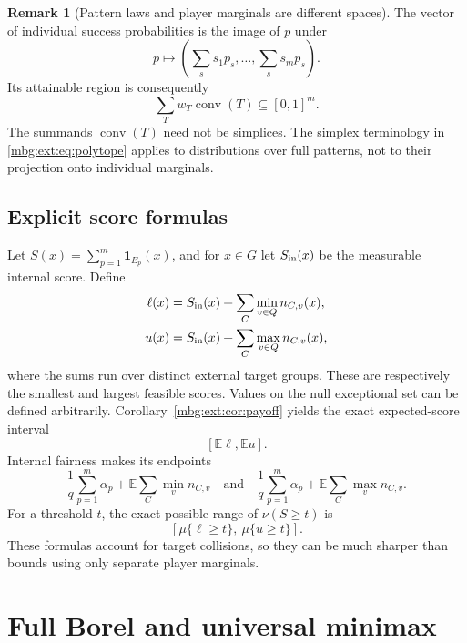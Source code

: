 \documentclass[11pt,letterpaper]{article}
\theoremstyle{definition}
\newtheorem{remark}[theorem]{Remark}
\newcommand{\E}{\mathbb E}
\newcommand{\ind}{\mathbf 1}
\newcommand{\conv}{\operatorname{conv}}
\begin{document}
\begin{remark}[Pattern laws and player marginals are different spaces]
The vector of individual success probabilities is the image of $p$ under
\[
p\longmapsto\left(\sum_s s_1p_s,\ldots,\sum_s s_mp_s\right).
\]
Its attainable region is consequently
\[
\sum_Tw_T\conv(T)\subseteq[0,1]^m.
\]
The summands $\conv(T)$ need not be simplices. The simplex terminology in \eqref{mbg:ext:eq:polytope} applies to distributions over full patterns, not to their projection onto individual marginals.
\end{remark}

\subsection{Explicit score formulas}

Let $S(x)=\sum_{p=1}^m\ind_{E_p}(x)$, and for $x\in G$ let $S_{\rm in}(x)$ be the measurable internal score. Define
\begin{align}
\ell(x)&=S_{\rm in}(x)+\sum_{C}\min_{v\in Q}n_{C,v}(x),\label{mbg:ext:eq:low-score}\\
u(x)&=S_{\rm in}(x)+\sum_{C}\max_{v\in Q}n_{C,v}(x),\label{mbg:ext:eq:high-score}
\end{align}
where the sums run over distinct external target groups. These are respectively the smallest and largest feasible scores. Values on the null exceptional set can be defined arbitrarily. Corollary~\ref{mbg:ext:cor:payoff} yields the exact expected-score interval
\begin{equation}
\left[\E\ell,\E u\right].
\label{mbg:ext:eq:score-interval}
\end{equation}
Internal fairness makes its endpoints
\[
\frac1q\sum_{p=1}^m\alpha_p
+\E\sum_C\min_v n_{C,v}
\quad\text{and}\quad
\frac1q\sum_{p=1}^m\alpha_p
+\E\sum_C\max_v n_{C,v}.
\]
For a threshold $t$, the exact possible range of $\nu(S\ge t)$ is
\begin{equation}
\left[\mu\{\ell\ge t\},\ \mu\{u\ge t\}\right].
\label{mbg:ext:eq:threshold}
\end{equation}
These formulas account for target collisions, so they can be much sharper than bounds using only separate player marginals.

\section{Full Borel and universal minimax}
\label{mbg:ext:sec:minimax}
\end{document}
